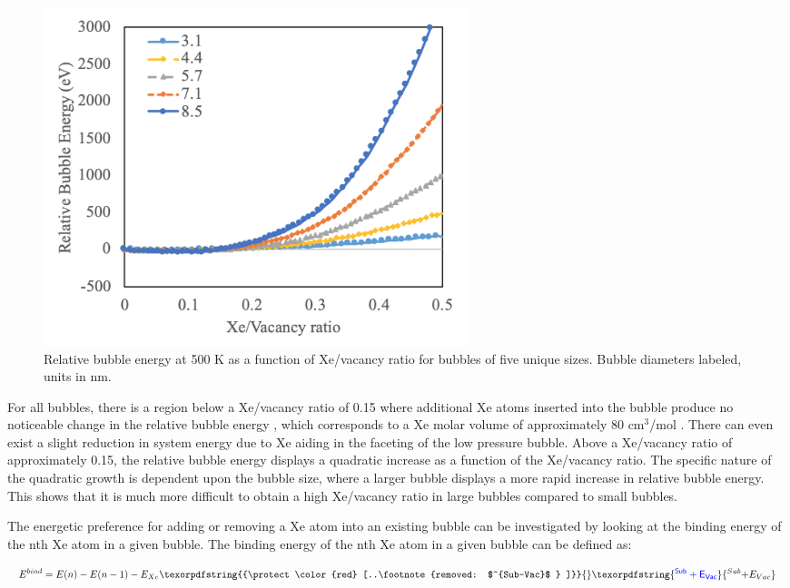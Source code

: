 \documentclass[review]{elsarticle}
\providecommand{\DIFaddtex}[1]{{\protect\color{blue} \sf #1}} %
\providecommand{\DIFdeltex}[1]{{\protect\color{red} [..\footnote{removed: #1} ]}} %
\providecommand{\DIFaddbegin}{} %
\providecommand{\DIFaddend}{} %
\providecommand{\DIFdelbegin}{} %
\providecommand{\DIFdelend}{} %
\providecommand{\DIFadd}[1]{\texorpdfstring{\DIFaddtex{#1}}{#1}} %
\providecommand{\DIFdel}[1]{\texorpdfstring{\DIFdeltex{#1}}{}} %
\newcommand{\DIFscaledelfig}{0.5}
\newlength{\DIFdelgraphicswidth} %
\newlength{\DIFdelgraphicsheight} %
\newcommand{\DIFaddincludegraphics}[2][]{{\color{blue}\fbox{\DIFOincludegraphics[#1]{#2}}}} %
\newcommand{\DIFdelincludegraphics}[2][]{%
\sbox{\DIFdelgraphicsbox}{\DIFOincludegraphics[#1]{#2}}%
\settoboxwidth{\DIFdelgraphicswidth}{\DIFdelgraphicsbox} %
\settoboxtotalheight{\DIFdelgraphicsheight}{\DIFdelgraphicsbox} %
\scalebox{\DIFscaledelfig}{%
\parbox[b]{\DIFdelgraphicswidth}{\usebox{\DIFdelgraphicsbox}\\[-\baselineskip] \rule{\DIFdelgraphicswidth}{0em}}\llap{\resizebox{\DIFdelgraphicswidth}{\DIFdelgraphicsheight}{%
\setlength{\unitlength}{\DIFdelgraphicswidth}%
\begin{picture}(1,1)%
\thicklines\linethickness{2pt} %
{\color[rgb]{1,0,0}\put(0,0){\framebox(1,1){}}}%
{\color[rgb]{1,0,0}\put(0,0){\line( 1,1){1}}}%
{\color[rgb]{1,0,0}\put(0,1){\line(1,-1){1}}}%
\end{picture}%
}\hspace*{3pt}}} %
} %
\DeclareRobustCommand{\DIFaddbegin}{\DIFOaddbegin \let\includegraphics\DIFaddincludegraphics} %
\DeclareRobustCommand{\DIFaddend}{\DIFOaddend \let\includegraphics\DIFOincludegraphics} %
\DeclareRobustCommand{\DIFdelbegin}{\DIFOdelbegin \let\includegraphics\DIFdelincludegraphics} %
\DeclareRobustCommand{\DIFdelend}{\DIFOaddend \let\includegraphics\DIFOincludegraphics} %
\begin{document}
\begin{figure}[h]
 \centering
 \includegraphics[width=0.6\textwidth]{3_bubE.png} 
 \caption{Relative bubble energy at 500 K as a function of Xe/vacancy ratio for bubbles of five unique sizes. Bubble diameters labeled, units in nm.}
 \label{fig:bubE}
\end{figure}

For all bubbles, there is a region below a Xe/vacancy ratio of 0.15 where additional Xe atoms inserted into the bubble produce no noticeable change in the relative bubble energy\DIFaddbegin \DIFadd{, which corresponds to a Xe molar volume of approximately 80 cm$^3$/mol }\DIFaddend . There can even exist a slight reduction in system energy due to Xe aiding in the faceting of the low pressure bubble. Above a Xe/vacancy ratio of approximately 0.15, the relative bubble energy displays a quadratic increase as a function of the Xe/vacancy ratio. The specific nature of the quadratic growth is dependent upon the bubble size, where a larger bubble displays a more rapid increase in relative bubble energy. This shows that it is much more difficult to obtain a high Xe/vacancy ratio in large bubbles compared to small bubbles. 

\FloatBarrier

The energetic preference for adding or removing a Xe atom into an existing bubble can be investigated by looking at the binding energy of the nth Xe atom in a given bubble. The binding energy of the nth Xe atom in a given bubble can be defined as:

\begin{equation}
\label{eq:bind}
E^{bind}= E(n)-E(n-1) - E_{Xe}\DIFdelbegin \DIFdel{$^{Sub-Vac}$
}\DIFdelend \DIFaddbegin \DIFadd{^{Sub} + E_{Vac}
}\DIFaddend \end{equation}
\end{document}
